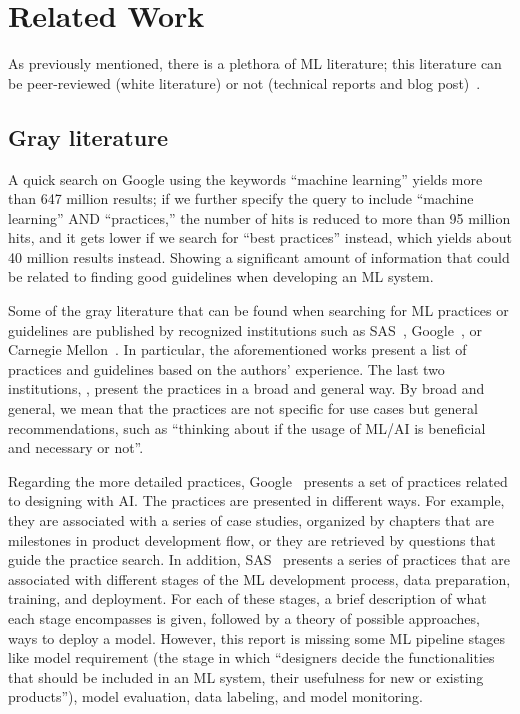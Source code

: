 
\section{Related Work}


As previously mentioned, there is a plethora of ML literature; this literature can be peer-reviewed (\ie white literature) or not (\eg technical reports and blog post)~\cite{soldani2019grey}. 

\subsection{Gray literature}
A quick  search on Google using the keywords  ``machine learning'' yields more than 647 million results; if we further specify  the query to include ``machine learning'' AND ``practices,'' the number of hits is reduced to more than 95 million hits, and it gets lower if we search for ``best practices'' instead, which yields about 40 million results instead.  Showing a significant amount of information that could be related to finding good guidelines when developing an ML system. 

Some of the gray literature that can be found when searching for ML practices or guidelines are published by recognized institutions such as SAS~\cite{wujek2016best}, Google~\cite{goole_pair, zinkevich_2021},  or Carnegie Mellon~\cite{horneman2020ai}. In particular, the aforementioned works present a list of practices and guidelines based on the authors' experience. The last two institutions, \cite{zinkevich_2021, horneman2020ai}, present the practices in a broad and general way.  By broad and general,  we mean that the practices are not specific for use cases but general recommendations, such as ``thinking about if the usage of ML/AI is beneficial and necessary or not''. 

Regarding the more detailed practices,  Google~\cite{goole_pair} presents a set of practices related  to designing with AI. The practices are presented in different ways. For example, they are associated with a series of case studies, organized by chapters that are milestones in product development flow, or they are retrieved by questions that guide the practice search. In addition, SAS~\cite{wujek2016best} presents a series of practices that are associated with different stages of the ML development process, \ie data preparation, training, and deployment.  For each of these stages, a brief description of what each stage encompasses is given, followed by a theory of possible approaches, \eg ways to deploy a model. However, this report is missing some  ML pipeline stages like model requirement (\ie the stage  in which  ``designers decide the functionalities that should be included in an ML system, their usefulness for new or existing products''), model evaluation,  data labeling, and model monitoring.


